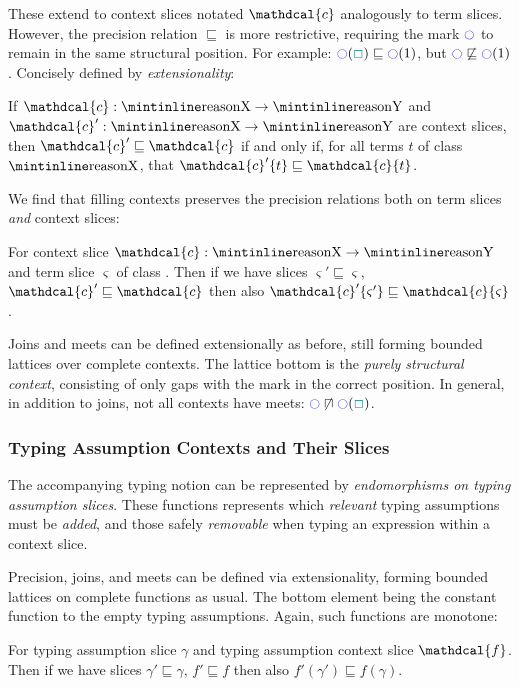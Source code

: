 \newcommand{\Cs}{\mathdcal{c}}
\newcommand{\p}{\mathdcal{p}}
These extend to context slices notated $\Cs$ analogously to term slices. However, the precision relation $\sqsubseteq$ is more restrictive, requiring the mark $\cmark$ to remain in the same structural position. For example: $\cmark(\gap) \sqsubseteq \cmark(1)$, but $\cmark \not \sqsubseteq \cmark(1)$. Concisely defined by \textit{extensionality}:

\begin{definition}\label{def:ContextPrecision}
If $\Cs : \code{X} \to \code{Y}$ and $\Cs' : \code{X} \to \code{Y}$ are context slices, then $\Cs' \sqsubseteq \Cs$ if and only if, for all terms $t$ of class $\code{X}$, that $\Cs'\{t\} \sqsubseteq \Cs\{t\}$.
\end{definition}

We find that filling contexts preserves the precision relations both on term slices \textit{and} context slices:
\begin{proposition}
For context slice $\Cs : \code{X} \to \code{Y}$ and term slice $\varsigma$ of class . Then if we have slices $\varsigma' \sqsubseteq \varsigma$, $\Cs' \sqsubseteq \Cs$ then also $\Cs'\{\varsigma'\} \sqsubseteq \Cs\{\varsigma\}$.
\end{proposition}

Joins and meets can be defined extensionally as before, still forming bounded lattices over complete contexts. The lattice bottom is the \textit{purely structural context}, consisting of only gaps with the mark in the correct position. In general, in addition to joins, not all contexts have meets: $\cmark\centernot \sqcap \cmark(\gap)$.

\subsubsection{Typing Assumption Contexts and Their Slices}
The accompanying typing notion can be represented by \textit{endomorphisms on typing assumption slices}. These functions represents which \textit{relevant} typing assumptions must be \textit{added}, and those safely \textit{removable} when typing an expression within a context slice.

\renewcommand{\F}{\mathdcal{F}}
\newcommand{\f}{\mathdcal{f}}

Precision, joins, and meets can be defined via extensionality, forming bounded lattices on complete functions as usual. The bottom element being the constant function to the empty typing assumptions. Again, such functions are monotone:
\begin{proposition}
For typing assumption slice $\gamma$ and typing assumption context slice $\f$. Then if we have slices $\gamma' \sqsubseteq \gamma$, $f' \sqsubseteq f$ then also $f'(\gamma') \sqsubseteq f(\gamma)$.
\end{proposition}

